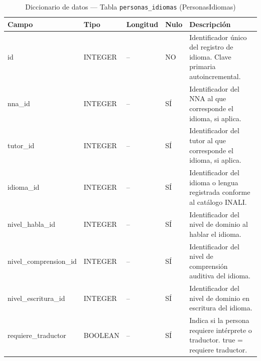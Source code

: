 \begin{table}[H]
	\centering
	\caption{Diccionario de datos --- Tabla \texttt{personas\_idiomas} (PersonasIdiomas)}
	\label{tab:data-dict-personas_idiomas}
	\scriptsize
	\begin{tabular}{>{\ttfamily\raggedright\arraybackslash}p{3.6cm} p{1.6cm} p{1.3cm} p{0.7cm} p{5.6cm}}
		\toprule
		\textbf{Campo} & \textbf{Tipo} & \textbf{Longitud} & \textbf{Nulo} & \textbf{Descripción} \\
		\midrule
		id & INTEGER & -- & NO & Identificador único del registro de idioma. Clave primaria autoincremental. \\
		nna\_id & INTEGER & -- & SÍ & Identificador del NNA al que corresponde el idioma, si aplica. \\
		tutor\_id & INTEGER & -- & SÍ & Identificador del tutor al que corresponde el idioma, si aplica. \\
		idioma\_id & INTEGER & -- & SÍ & Identificador del idioma o lengua registrada conforme al catálogo INALI. \\
		nivel\_habla\_id & INTEGER & -- & SÍ & Identificador del nivel de dominio al hablar el idioma. \\
		nivel\_comprension\_id & INTEGER & -- & SÍ & Identificador del nivel de comprensión auditiva del idioma. \\
		nivel\_escritura\_id & INTEGER & -- & SÍ & Identificador del nivel de dominio en escritura del idioma. \\
		requiere\_traductor & BOOLEAN & -- & SÍ & Indica si la persona requiere intérprete o traductor. true = requiere traductor. \\
		\bottomrule
	\end{tabular}
\end{table}

